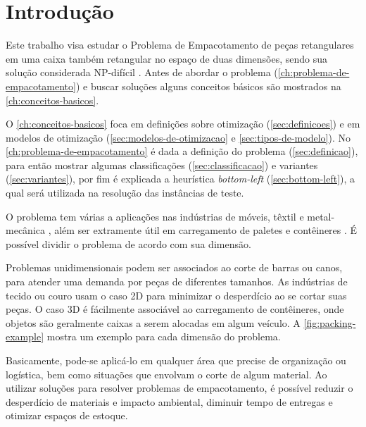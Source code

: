 \chapter{Introdução}\label{ch:introducao}

Este trabalho visa estudar o Problema de Empacotamento de peças retangulares em uma caixa também retangular no espaço de duas dimensões, sendo sua solução considerada NP-difícil \cite{2DPackLib}.
Antes de abordar o problema (\autoref{ch:problema-de-empacotamento}) e buscar soluções alguns conceitos básicos são mostrados na \autoref{ch:conceitos-basicos}.

O \autoref{ch:conceitos-basicos} foca em definições sobre otimização (\autoref{sec:definicoes}) e em modelos de otimização (\autoref{sec:modelos-de-otimizacao} e \autoref{sec:tipos-de-modelo}).
No \autoref{ch:problema-de-empacotamento} é dada a definição do problema (\autoref{sec:definicao}), para então mostrar algumas classificações (\autoref{sec:classificacao}) e variantes (\autoref{sec:variantes}), por fim é explicada a heurística \textit{bottom-left} (\autoref{sec:bottom-left}), a qual será utilizada na resolução das instâncias de teste.

O problema tem várias a aplicações nas indústrias de móveis, têxtil e metal-mecânica \cite{queiroz2022estudo, cavali2004problemas, belluzzo2005otimizacao}, além ser extramente útil em carregamento de paletes e contêineres \cite{morabito1992abordagem}.
É possível dividir o problema de acordo com sua dimensão.

Problemas unidimensionais podem ser associados ao corte de barras ou canos, para atender uma demanda por peças de diferentes tamanhos.
As indústrias de tecido ou couro usam o caso 2D para minimizar o desperdício ao se cortar suas peças.
O caso 3D é fácilmente associável ao carregamento de contêineres, onde objetos são geralmente caixas a serem alocadas em algum veículo.
A \autoref{fig:packing-example} mostra um exemplo para cada dimensão do problema.



Basicamente, pode-se aplicá-lo em qualquer área que precise de organização ou logística, bem como situações que envolvam o corte de algum material.
Ao utilizar soluções para resolver problemas de empacotamento, é possível reduzir o desperdício de materiais e impacto ambiental, diminuir tempo de entregas e otimizar espaços de estoque.


